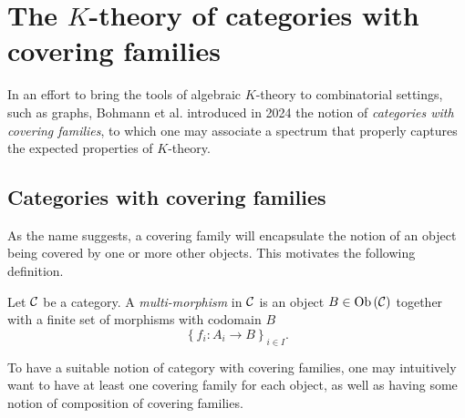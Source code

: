 \section[The K-theory of categories with covering families]{The $K$-theory of categories with covering families}
In an effort to bring the tools of algebraic $K$-theory to combinatorial settings, such as graphs, Bohmann et al. introduced in 2024 the notion of \emph{categories with covering families}, to which one may associate a spectrum that properly captures the expected properties of $K$-theory.

\subsection{Categories with covering families}\label{subsection:covering}
As the name suggests, a covering family will encapsulate the notion of an object being covered by one or more other objects. This motivates the following definition.

\begin{definition}
    Let $\mathcal{C}$ be a category. A \emph{multi-morphism} in $\mathcal{C}$ is an object $B \in \operatorname{Ob}{\lparen \mathcal{C} \rparen}$ together with a finite set of morphisms with codomain $B$
    \[ \left\{ f_i : A_i \to B \right\}_{i \in I}. \]
\end{definition}

To have a suitable notion of category with covering families, one may intuitively want to have at least one covering family for each object, as well as having some notion of composition of covering families.

